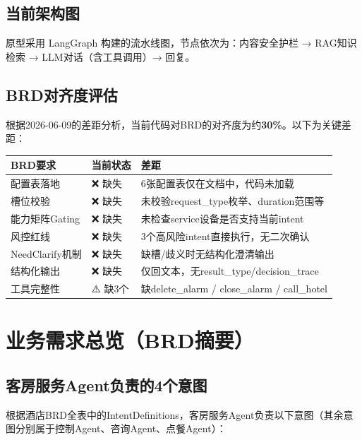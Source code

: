 \documentclass[12pt,a4paper]{ctexart}
\begin{document}
\subsection{当前架构图}

原型采用 LangGraph 构建的流水线图，节点依次为：内容安全护栏 → RAG知识检索 → LLM对话（含工具调用）→ 回复。

\subsection{BRD对齐度评估}

根据2026-06-09的差距分析，当前代码对BRD的对齐度为约\textbf{30\%}。以下为关键差距：

\begin{table}[h]
\centering
\begin{tabular}{@{}p{3cm}p{3cm}p{7cm}@{}}
\toprule
\textbf{BRD要求} & \textbf{当前状态} & \textbf{差距} \\
\midrule
配置表落地 & ❌ 缺失 & 6张配置表仅在文档中，代码未加载 \\
槽位校验 & ❌ 缺失 & 未校验request\_type枚举、duration范围等 \\
能力矩阵Gating & ❌ 缺失 & 未检查service设备是否支持当前intent \\
风控红线 & ❌ 缺失 & 3个高风险intent直接执行，无二次确认 \\
NeedClarify机制 & ❌ 缺失 & 缺槽/歧义时无结构化澄清输出 \\
结构化输出 & ❌ 缺失 & 仅回文本，无result\_type/decision\_trace \\
工具完整性 & ⚠️ 缺3个 & 缺delete\_alarm / close\_alarm / call\_hotel \\
\bottomrule
\end{tabular}
\end{table}

\newpage

\section{业务需求总览（BRD摘要）}

\subsection{客房服务Agent负责的4个意图}

根据酒店BRD全表中的IntentDefinitions，客房服务Agent负责以下意图（其余意图分别属于控制Agent、咨询Agent、点餐Agent）：
\end{document}
